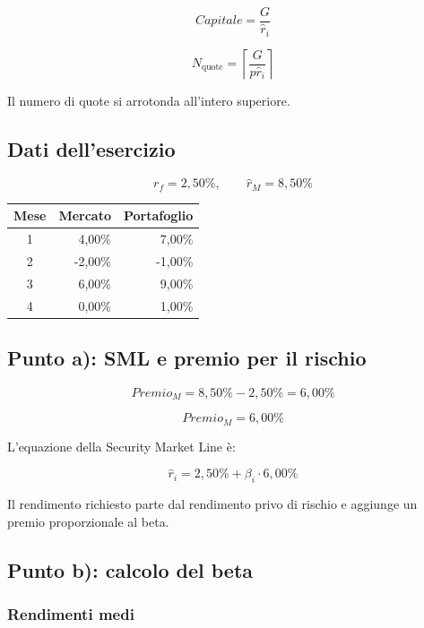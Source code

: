 \[
    Capitale=\frac{G}{\widehat r_i}
\]

\[
    N_{\text{quote}}
    =
    \left\lceil\frac{G}{p\widehat r_i}\right\rceil
\]

\noindent Il numero di quote si arrotonda all'intero superiore.

\subsection*{Dati dell'esercizio}

\[
    r_f=2{,}50\%,
    \qquad
    \widehat r_M=8{,}50\%
\]

\begin{center}
    \begin{tabular}{crr}
        \hline
        Mese & Mercato & Portafoglio \\
        \hline
        1 & 4,00\% & 7,00\% \\
        2 & -2,00\% & -1,00\% \\
        3 & 6,00\% & 9,00\% \\
        4 & 0,00\% & 1,00\% \\
        \hline
    \end{tabular}
\end{center}

\subsection{Punto a): SML e premio per il rischio}

\[
    Premio_M=8{,}50\%-2{,}50\%=6{,}00\%
\]

\[
    \boxed{Premio_M=6{,}00\%}
\]

\noindent L'equazione della Security Market Line è:

\[
    \boxed{
        \widehat r_i
        =
        2{,}50\%+\beta_i\cdot6{,}00\%
    }
\]

\noindent Il rendimento richiesto parte dal rendimento privo
di rischio e aggiunge un premio proporzionale al beta.

\subsection{Punto b): calcolo del beta}

\subsubsection*{Rendimenti medi}

